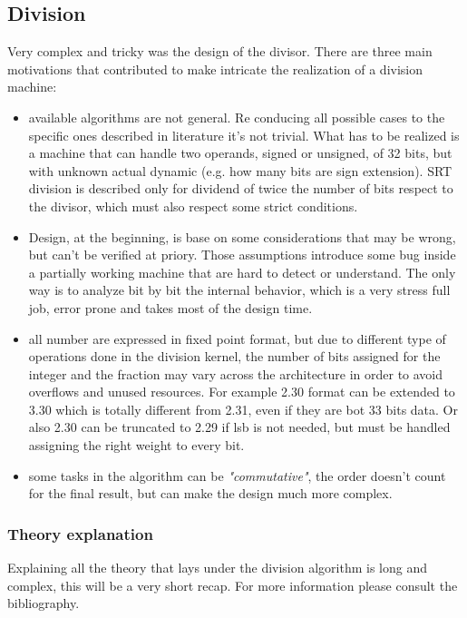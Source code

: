 \subsection{Division}
Very complex and tricky was the design of the divisor. There are three main motivations that contributed to make intricate the realization of a division machine:
\begin{itemize}
    \item available algorithms are not general. Re conducing all possible cases to the specific ones described in literature it's not trivial. What has to be realized is a machine that can handle two operands, signed or unsigned, of 32 bits, but with unknown actual dynamic (e.g. how many bits are sign extension). SRT division is described only for dividend of twice the number of bits respect to the divisor, which must also respect some strict conditions. 
    \item Design, at the beginning, is base on some considerations that may be wrong, but can't be verified at priory. Those assumptions introduce some bug inside a partially working machine that are hard to detect or understand. The only way is to analyze bit by bit the internal behavior, which is a very stress full job, error prone and takes most of the design time.
    \item all number are expressed in fixed point format, but due to different type of operations done in the division kernel, the number of bits assigned for the integer and the fraction may vary across the architecture in order to avoid overflows and unused resources. For example 2.30 format can be extended to 3.30 which is totally different from 2.31, even if they are bot 33 bits data. Or also 2.30 can be truncated to 2.29 if lsb is not needed, but must be handled assigning the right weight to every bit.
    \item some tasks in the algorithm can be \textit{"commutative"}, the order doesn't count for the final result, but can make the design much more complex. 
\end{itemize}
\subsubsection{Theory explanation}
Explaining all the theory that lays under the division algorithm is long and complex, this will be a very short recap. For more information please consult the bibliography.\\
